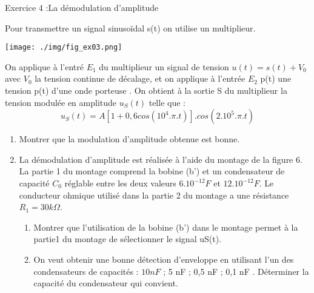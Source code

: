 \documentclass[12pt, french]{article}
\begin{document}
\begin{Box2}{Exercice 4 :La  démodulation  d’amplitude }

Pour transmettre un signal sinusoïdal s(t) on utilise un
multiplieur.

  \begin{center}
	  \vspace{-1cm} 
	\texttt{[image: ./img/fig\_ex03.png]}
  \end{center}


On applique à l’entré $E_1$ du multiplieur un signal de tension
$u(t)=s(t)+V_0$ avec $V_0$ la tension continue de décalage, et on
applique à l’entrée $E_2$ p(t) une tension p(t) d’une onde porteuse . On obtient à la sortie S du multiplieur la tension
modulée en amplitude $u_S(t)$ telle que :
$$u_S(t) = A[1+0,6cos(10^4.\pi.t)].cos(2.10^5.\pi.t)$$
\begin{enumerate}
	\item  Montrer que la modulation d’amplitude
obtenue est bonne.
\item  La  démodulation  d’amplitude est réalisée à
l’aide du montage de la figure 6.
La partie 1 du montage comprend la bobine (b’) et un
condensateur de capacité $C_0$ réglable entre les deux
valeurs $6.10^{-12} F$ et $12.10^{-12} F$. Le conducteur ohmique
utilisé dans la partie 2 du montage a une résistance $R_1=30k\Omega$.
\begin{enumerate}
	
	\item  Montrer que l’utilisation de la bobine (b’) dans
le montage permet à la partie1 du montage de
sélectionner le signal uS(t).
\item  On veut obtenir une bonne détection d’enveloppe en utilisant l’un des condensateurs de capacités : $10 nF$ ;
5 nF ; 0,5 nF ; 0,1 nF . Déterminer la capacité du condensateur qui convient.
\end{enumerate}
\end{enumerate}
\end{Box2}


\end{document}
